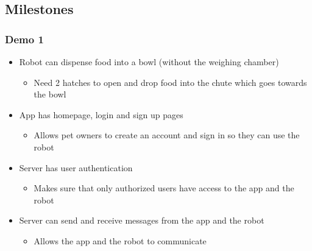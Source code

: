     \subsection{Milestones}
        \subsubsection{Demo 1}
        \begin{itemize}
            \setlength{\itemindent}{.2in}
            \item Robot can dispense food into a bowl (without the weighing chamber)
                \begin{itemize}
                \setlength{\itemindent}{.3in}
                    \item Need 2 hatches to open and drop food into the chute which goes towards the bowl
                \end{itemize}
            \item App has homepage, login and sign up pages 
                \begin{itemize}
                    \setlength{\itemindent}{.3in}
                    \item Allows pet owners to create an account and sign in so they can use the robot 
                \end{itemize}
            \item Server has user authentication
                \begin{itemize}
                    \setlength{\itemindent}{.3in}
                    \item Makes sure that only authorized users have access to the app and the robot 
                \end{itemize}
            \item Server can send and receive messages from the app and the robot
                \begin{itemize}
                    \setlength{\itemindent}{.3in}
                    \item Allows the app and the robot to communicate 
                \end{itemize}
        \end{itemize}
